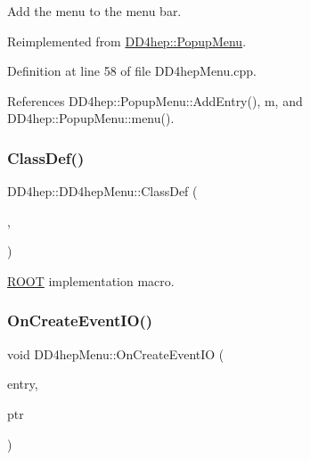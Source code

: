 Add the menu to the menu bar. 



Reimplemented from \hyperlink{class_d_d4hep_1_1_popup_menu_a896a1626d79fd3d6ccb1c1e0657cf1ae}{D\+D4hep\+::\+Popup\+Menu}.



Definition at line 58 of file D\+D4hep\+Menu.\+cpp.



References D\+D4hep\+::\+Popup\+Menu\+::\+Add\+Entry(), m, and D\+D4hep\+::\+Popup\+Menu\+::menu().

\hypertarget{class_d_d4hep_1_1_d_d4hep_menu_af3b9cf3c445924532b16883e46833624}{}\label{class_d_d4hep_1_1_d_d4hep_menu_af3b9cf3c445924532b16883e46833624} 
\subsubsection{\texorpdfstring{Class\+Def()}{ClassDef()}}
{\footnotesize\ttfamily D\+D4hep\+::\+D\+D4hep\+Menu\+::\+Class\+Def (\begin{DoxyParamCaption}\item[{\hyperlink{class_d_d4hep_1_1_d_d4hep_menu}{D\+D4hep\+Menu}}]{,  }\item[{0}]{ }\end{DoxyParamCaption})}



\hyperlink{namespace_r_o_o_t}{R\+O\+OT} implementation macro. 

\hypertarget{class_d_d4hep_1_1_d_d4hep_menu_a560b5e3a05e4d3ef571fa876ac1dcdd2}{}\label{class_d_d4hep_1_1_d_d4hep_menu_a560b5e3a05e4d3ef571fa876ac1dcdd2} 
\subsubsection{\texorpdfstring{On\+Create\+Event\+I\+O()}{OnCreateEventIO()}}
{\footnotesize\ttfamily void D\+D4hep\+Menu\+::\+On\+Create\+Event\+IO (\begin{DoxyParamCaption}\item[{T\+G\+Menu\+Entry $\ast$}]{entry,  }\item[{void $\ast$}]{ptr }\end{DoxyParamCaption})}



